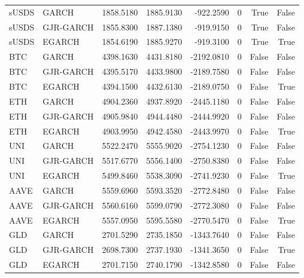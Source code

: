 \begin{tabular}{llrrrrrr}
sUSDS & GARCH & 1858.5180 & 1885.9130 & -922.2590 & 0 & True & False \\
sUSDS & GJR-GARCH & 1855.8300 & 1887.1380 & -919.9150 & 0 & True & False \\
sUSDS & EGARCH & 1854.6190 & 1885.9270 & -919.3100 & 0 & True & True \\
BTC & GARCH & 4398.1630 & 4431.8180 & -2192.0810 & 0 & False & False \\
BTC & GJR-GARCH & 4395.5170 & 4433.9800 & -2189.7580 & 0 & False & False \\
BTC & EGARCH & 4394.1500 & 4432.6130 & -2189.0750 & 0 & False & True \\
ETH & GARCH & 4904.2360 & 4937.8920 & -2445.1180 & 0 & False & False \\
ETH & GJR-GARCH & 4905.9840 & 4944.4480 & -2444.9920 & 0 & False & False \\
ETH & EGARCH & 4903.9950 & 4942.4580 & -2443.9970 & 0 & False & True \\
UNI & GARCH & 5522.2470 & 5555.9020 & -2754.1230 & 0 & False & False \\
UNI & GJR-GARCH & 5517.6770 & 5556.1400 & -2750.8380 & 0 & False & False \\
UNI & EGARCH & 5499.8460 & 5538.3090 & -2741.9230 & 0 & False & True \\
AAVE & GARCH & 5559.6960 & 5593.3520 & -2772.8480 & 0 & False & False \\
AAVE & GJR-GARCH & 5560.6160 & 5599.0790 & -2772.3080 & 0 & False & False \\
AAVE & EGARCH & 5557.0950 & 5595.5580 & -2770.5470 & 0 & False & True \\
GLD & GARCH & 2701.5290 & 2735.1850 & -1343.7640 & 0 & False & False \\
GLD & GJR-GARCH & 2698.7300 & 2737.1930 & -1341.3650 & 0 & False & True \\
GLD & EGARCH & 2701.7150 & 2740.1790 & -1342.8580 & 0 & False & False \\
\bottomrule
\end{tabular}
